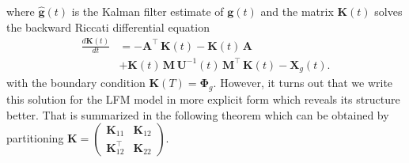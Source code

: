 \documentclass[journal]{IEEEtran}
\begin{document}
%
where $\hat{\mathbf{g}}(t)$ is the Kalman filter estimate of $\mathbf{g}(t)$ and the matrix $\mathbf{K}(t)$ solves the backward Riccati differential equation
%
\begin{equation}
\begin{split}
  \frac{d\mathbf{K}(t)}{dt} &=
    -\mathbf{A}^{\top} \, \mathbf{K}(t) - \mathbf{K}(t) \, \mathbf{A} \\
  &+  \mathbf{K}(t) \, \mathbf{M} \, \mathbf{U}^{-1}(t) \,
   \mathbf{M}^{\top} \, \mathbf{K}(t) - \mathbf{X}_g(t).
\end{split}
\end{equation}
%
with the boundary condition $\mathbf{K}(T) =  \boldsymbol{\Phi}_g$. However, it turns out that we write this solution for the LFM model in more explicit form which reveals its structure better. That is summarized in the following theorem which can be obtained by partitioning $\mathbf{K} = \begin{pmatrix} \mathbf{K}_{11} & \mathbf{K}_{12} \\ \mathbf{K}_{12}^{\top} & \mathbf{K}_{22} \end{pmatrix}$.
\end{document}

